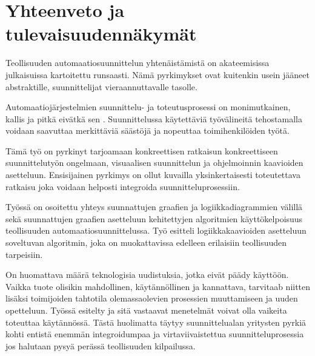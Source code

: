 \documentclass[finnish,12pt]{article}
\begin{document}




	\clearpage

	\section{Yhteenveto ja tulevaisuudennäkymät}

Teollisuuden automaatiosuunnittelun yhtenäistämistä on akateemisissa julkaisuissa kartoitettu runsaasti.
Nämä pyrkimykset ovat kuitenkin usein jääneet abstraktille, suunnittelijat vieraannuttavalle tasolle.

Automaatiojärjestelmien suunnittelu- ja toteutusprosessi on monimutkainen, kallis ja pitkä eivätkä sen .
Suunnittelussa käytettäviä työvälineitä tehostamalla voidaan saavuttaa merkittäviä säästöjä ja nopeuttaa toimihenkilöiden työtä.

Tämä työ on pyrkinyt tarjoamaan konkreettisen ratkaisun konkreettiseen suunnittelutyön ongelmaan, visuaalisen suunnittelun ja ohjelmoinnin kaavioiden asetteluun.
Ensisijainen pyrkimys on ollut kuvailla yksinkertaisesti toteutettava ratkaisu joka voidaan helposti integroida suunnitteluprosessiin.

Työssä on osoitettu yhteys suunnattujen graafien ja logiikkadiagrammien välillä sekä suunnattujen graafien asetteluun kehitettyjen algoritmien käyttökelpoisuus teollisuuden automaatiosuunnittelussa.
Työ esitteli logiikkakaavioiden asetteluun soveltuvan algoritmin, joka on muokattavissa edelleen erilaisiin teollisuuden tarpeisiin.

On huomattava määrä teknologisia uudistuksia, jotka eivät päädy käyttöön.
Vaikka tuote olisikin mahdollinen, käytännöllinen ja kannattava, tarvitaab niitten lisäksi toimijoiden tahtotila olemassaolevien prosessien muuttamiseen ja uuden opetteluun.
Työssä esitelty ja sitä vastaavat menetelmät voivat olla vaikeita toteuttaa käytännössä.
Tästä huolimatta täytyy suunnittelualan yritysten pyrkiä kohti entistä enemmän integroidumpaa ja virtaviivaistettua suunnitteluprosessia jos halutaan pysyä perässä teollisuuden kilpailussa.


\clearpage
{}


\end{document}
